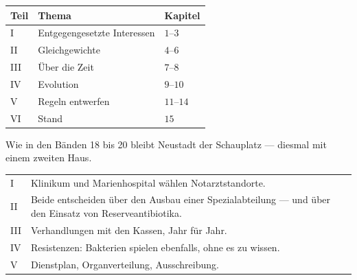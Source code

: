 \begin{merksatz}
\begin{center}
{\small
\renewcommand{\arraystretch}{1.5}
\begin{tabular}{@{}P{1.4cm}P{2.8cm}P{3.8cm}@{}}
\toprule
\textbf{Teil} & \textbf{Thema} & \textbf{Kapitel}\\
\midrule
I & Entgegengesetzte Interessen & $1$--$3$\\
II & Gleichgewichte & $4$--$6$\\
III & Über die Zeit & $7$--$8$\\
IV & Evolution & $9$--$10$\\
V & Regeln entwerfen & $11$--$14$\\
VI & Stand & $15$\\
\bottomrule
\end{tabular}}
\end{center}

Wie in den Bänden 18 bis 20 bleibt Neustadt der Schauplatz --- diesmal mit einem zweiten Haus.

\begin{center}
{\small
\renewcommand{\arraystretch}{1.5}
\begin{tabular}{@{}P{1.4cm}P{6.8cm}@{}}
\toprule
I & Klinikum und Marienhospital wählen Notarztstandorte.\\
II & Beide entscheiden über den Ausbau einer Spezialabteilung --- und über den Einsatz von Reserveantibiotika.\\
III & Verhandlungen mit den Kassen, Jahr für Jahr.\\
IV & Resistenzen: Bakterien spielen ebenfalls, ohne es zu wissen.\\
V & Dienstplan, Organverteilung, Ausschreibung.\\
\bottomrule
\end{tabular}}
\end{center}

\begin{center}
\begin{minipage}{0.88\textwidth}
\end{minipage}
\end{center}
\end{merksatz}

